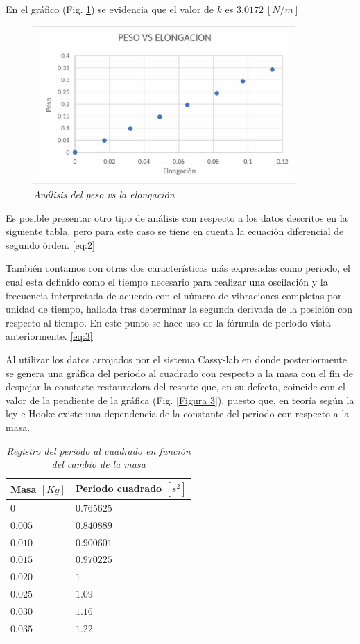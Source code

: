 \documentclass[spanish,notitlepage,letterpaper, 12pt]{article}
\begin{document}
En el gráfico (Fig. \ref{Figura 2}) se evidencia que el valor de $k$ es $3.0172 \ [N/m]$
\newpage
\begin{figure}[ht]
    \centering
    \includegraphics[width=10.0cm]{images/peso-vs-elongacion.png}
    \caption{\textit{Análisis del peso vs la elongación}}
    \label{Figura 2}
\end{figure}
Es posible presentar otro tipo de análisis con respecto a los datos descritos en la siguiente tabla, pero para este caso se tiene en cuenta la ecuación diferencial de segundo órden. \eqref{eq:2}\par
\bigskip
También contamos con otras dos características más expresadas como periodo, el cual esta definido como el tiempo necesario para realizar una oscilación y la frecuencia interpretada de acuerdo con el número de vibraciones completas por unidad de tiempo, hallada tras determinar la segunda derivada de
la posición con respecto al tiempo. En este punto se hace uso de la fórmula de periodo vista anteriormente. \eqref{eq:3}\par
\bigskip
Al utilizar los datos arrojados por el sistema Cassy-lab en donde posteriormente se genera una gráfica del periodo al cuadrado con respecto a la masa con el fin de despejar la constaste restauradora del resorte que, en su defecto, coincide con el valor de la pendiente de la gráfica (Fig. \ref{Figura
3}), puesto que, en teoría según la ley e Hooke existe una dependencia de la constante del periodo con respecto a la masa.
\newpage
\begin{table}[ht]
    \centering
    \begin{tabular}{l|l}
        Masa $[Kg]$ & Periodo cuadrado $[s^2]$ \\
        \hline \hline
        $0$ & $0.765625$ \\
        $0.005$ & $0.840889$ \\
        $0.010$ & $0.900601$ \\
        $0.015$ & $0.970225$ \\
        $0.020$ & $1$ \\
        $0.025$ & $1.09$ \\
        $0.030$ & $1.16$ \\
        $0.035$ & $1.22$ \\
    \end{tabular}
    \caption{\textit{Registro del periodo al cuadrado en función del cambio de la masa}}
    \label{Table 2}
\end{table}
\end{document}
